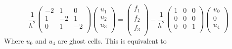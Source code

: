 \documentclass[11pt]{article}
\begin{document}
\begin{equation}
\frac{1}{h^2}
 \begin{pmatrix}
  -2 &  1 &  0 \\
   1 & -2 &  1 \\
   0 &  1 & -2 \\
 \end{pmatrix}
 \begin{pmatrix}
  u_1 \\  u_2 \\  u_3 \\
 \end{pmatrix}
  =
 \begin{pmatrix}
  f_1 \\  f_2 \\  f_3 \\
 \end{pmatrix}
   -
\frac{1}{h^2}
 \begin{pmatrix}
   1 &  0 &  0 \\
   0 &  0 &  0 \\
   0 &  0 &  1 \\
 \end{pmatrix}
 \begin{pmatrix}
  u_0 \\
  0 \\
  u_4 \\
 \end{pmatrix}
\end{equation}
Where $u_0$ and $u_4$ are ghost cells. This is equivalent to
\end{document}

